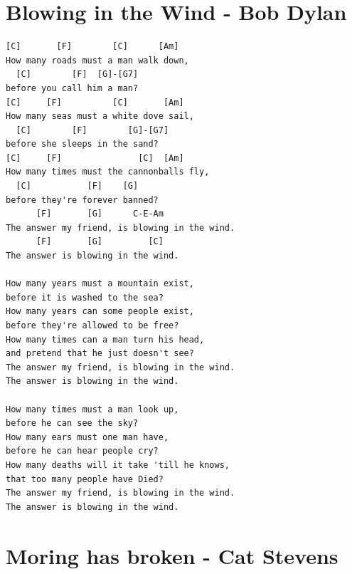 \documentclass[
]{book}
\let\stdsection\section
\renewcommand\section{\clearpage\stdsection}
\begin{document}
\hypertarget{classics-blowing-in-the-wind}{%
\section{Blowing in the Wind - Bob Dylan}\label{classics-blowing-in-the-wind}}

\begin{verbatim}
[C]       [F]        [C]      [Am] 
How many roads must a man walk down, 
  [C]        [F]  [G]-[G7]
before you call him a man?
[C]     [F]          [C]       [Am] 
How many seas must a white dove sail, 
  [C]        [F]        [G]-[G7]
before she sleeps in the sand?
[C]     [F]               [C]  [Am]
How many times must the cannonballs fly, 
  [C]           [F]    [G]
before they're forever banned?
      [F]       [G]      C-E-Am             
The answer my friend, is blowing in the wind.
      [F]       [G]         [C]
The answer is blowing in the wind.

How many years must a mountain exist, 
before it is washed to the sea?
How many years can some people exist, 
before they're allowed to be free? 
How many times can a man turn his head, 
and pretend that he just doesn't see?
The answer my friend, is blowing in the wind.
The answer is blowing in the wind.

How many times must a man look up, 
before he can see the sky?
How many ears must one man have, 
before he can hear people cry?
How many deaths will it take 'till he knows, 
that too many people have Died?
The answer my friend, is blowing in the wind.
The answer is blowing in the wind.

\end{verbatim}

\hypertarget{classics-morning-has-broken}{%
\section{Moring has broken - Cat Stevens}\label{classics-morning-has-broken}}
\end{document}
